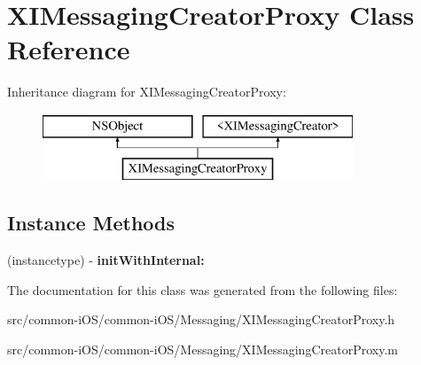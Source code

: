 \hypertarget{interface_x_i_messaging_creator_proxy}{}\section{X\+I\+Messaging\+Creator\+Proxy Class Reference}
\label{interface_x_i_messaging_creator_proxy}
Inheritance diagram for X\+I\+Messaging\+Creator\+Proxy\+:\begin{figure}[H]
\begin{center}
\leavevmode
\includegraphics[height=2.000000cm]{interface_x_i_messaging_creator_proxy}
\end{center}
\end{figure}
\subsection*{Instance Methods}
\begin{DoxyCompactItemize}
\item 
\hypertarget{interface_x_i_messaging_creator_proxy_a6ee758ed663d1ba0a8f2dc8aed43b547}{}\label{interface_x_i_messaging_creator_proxy_a6ee758ed663d1ba0a8f2dc8aed43b547} 
(instancetype) -\/ {\bfseries init\+With\+Internal\+:}
\end{DoxyCompactItemize}


The documentation for this class was generated from the following files\+:\begin{DoxyCompactItemize}
\item 
src/common-\/i\+O\+S/common-\/i\+O\+S/\+Messaging/X\+I\+Messaging\+Creator\+Proxy.\+h\item 
src/common-\/i\+O\+S/common-\/i\+O\+S/\+Messaging/X\+I\+Messaging\+Creator\+Proxy.\+m\end{DoxyCompactItemize}
